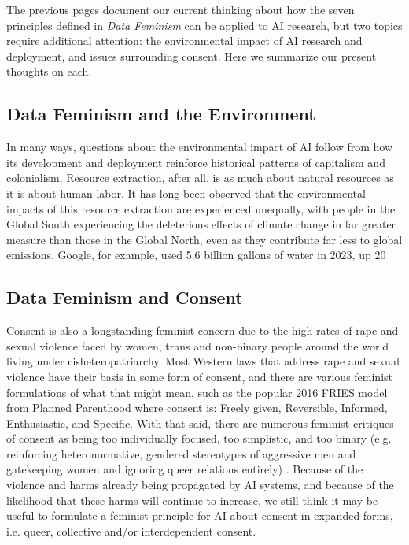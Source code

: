The previous pages document our current thinking about how the seven principles defined in \textit{Data Feminism} can be applied to AI research, but two topics require additional attention: the environmental impact of AI research and deployment, and issues surrounding consent. Here we summarize our present thoughts on each.

\subsection{Data Feminism and the Environment}

In many ways, questions about the environmental impact of AI follow from how its development and deployment reinforce historical patterns of capitalism and colonialism. Resource extraction, after all, is as much about natural resources as it is about human labor. It has long been observed that the environmental impacts of this resource extraction are experienced unequally, with people in the Global South experiencing the deleterious effects of climate change in far greater measure than those in the Global North, even as they contribute far less to global emissions. Google, for example, used 5.6 billion gallons of water in 2023, up 20\
\subsection{Data Feminism and Consent}

Consent is also a longstanding feminist concern due to the high rates of rape and sexual violence faced by women, trans and non-binary people around the world living under cisheteropatriarchy. Most Western laws that address rape and sexual violence have their basis in some form of consent, and there are various feminist formulations of what that might mean, such as the popular 2016 FRIES model from Planned Parenthood where consent is: Freely given, Reversible, Informed, Enthusiastic, and Specific. With that said, there are numerous feminist critiques of consent as being too individually focused, too simplistic, and too binary (e.g. reinforcing heteronormative, gendered stereotypes of aggressive men and gatekeeping women and ignoring queer relations entirely) \cite{Alcoff_2018, Edenfield_2019, MacKinnon_2016}. Because of the violence and harms already being propagated by AI systems, and because of the likelihood that these harms will continue to increase, we still think it may be useful to formulate a feminist principle for AI about consent in expanded forms, i.e. queer, collective and/or interdependent consent. 

